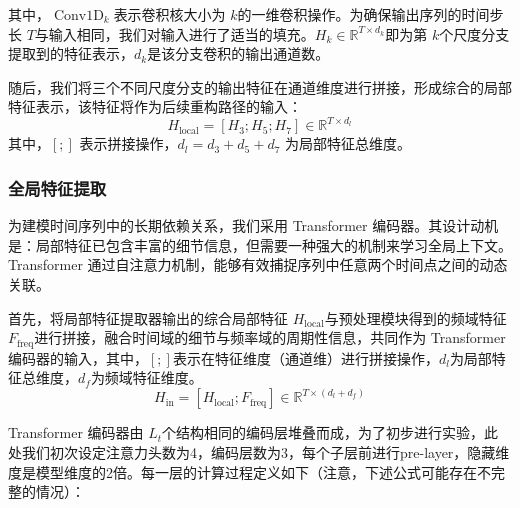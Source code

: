 \documentclass{setp-new}
\begin{document}
其中，$\operatorname{Conv1D}_{k}$表示卷积核大小为 $k$的一维卷积操作。为确保输出序列的时间步长 $T$与输入相同，我们对输入进行了适当的填充。$H_k \in \mathbb{R}^{T \times d_k}$即为第 $k$个尺度分支提取到的特征表示，$d_k$是该分支卷积的输出通道数。

随后，我们将三个不同尺度分支的输出特征在通道维度进行拼接，形成综合的局部特征表示，该特征将作为后续重构路径的输入：
\begin{equation}
H_{\text{local}} = [H_3; H_5; H_7] \in \mathbb{R}^{T \times d_l}
\end{equation}
其中，$[;]$ 表示拼接操作，$d_l = d_3 + d_5 + d_7$ 为局部特征总维度。

\subsubsection{全局特征提取}
为建模时间序列中的长期依赖关系，我们采用 Transformer 编码器。其设计动机是：局部特征已包含丰富的细节信息，但需要一种强大的机制来学习全局上下文。Transformer 通过自注意力机制，能够有效捕捉序列中任意两个时间点之间的动态关联。

首先，将局部特征提取器输出的综合局部特征 $H_{\text{local}}$与预处理模块得到的频域特征 $F_{\text{freq}}$进行拼接，融合时间域的细节与频率域的周期性信息，共同作为 Transformer 编码器的输入，其中，$[;]$表示在特征维度（通道维）进行拼接操作，$d_l$为局部特征总维度，$d_f$为频域特征维度。
\begin{equation}
H_{\text{in}} = [H_{\text{local}}; F_{\text{freq}}] \in \mathbb{R}^{T \times (d_l + d_f)}
\end{equation}

Transformer 编码器由 $L_t$个结构相同的编码层堆叠而成，为了初步进行实验，此处我们初次设定注意力头数为4，编码层数为3，每个子层前进行pre-layer，隐藏维度是模型维度的2倍。每一层的计算过程定义如下（注意，下述公式可能存在不完整的情况）：
    
\end{document}
